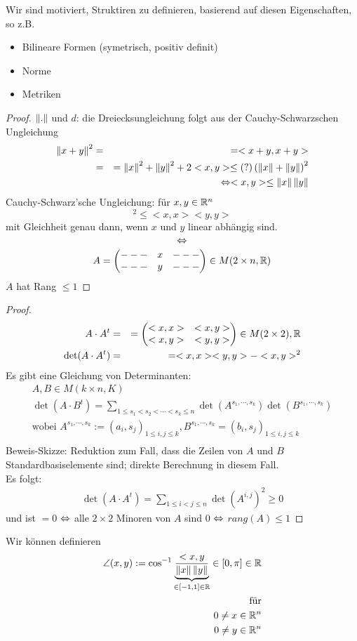 Wir sind motiviert, Struktiren zu definieren, basierend auf diesen Eigenschaften, so z.B.
\begin{itemize}
  \item Bilineare Formen (symetrisch, positiv definit)
  \item Norme
  \item Metriken
\end{itemize}
\begin{proof} $\left\| . \right\|$ und $d$: die Dreiecksungleichung folgt aus der Cauchy-Schwarzschen Ungleichung
\begin{align*}
  \left\| x+y \right\|^2&=&=<x+y,x+y>\\
  &=&=\left\| x \right\|^2+\left\| y \right\|^2+2<x,y> \leq (?) \left(\left\| x \right\|+\left\| y \right\|\right)^2\\
  &&\Leftrightarrow <x,y> \leq \left\| x \right\|\left\| y \right\|
\end{align*}
Cauchy-Schwarz'sche Ungleichung: für $x,y\in\mathbb{R}^n$
\[<x,y>^2\leq<x,x><y,y>\]
mit Gleichheit genau dann, wenn $x$ und $y$ linear abhängig sind.
\[\Leftrightarrow\]
\[A=\begin{pmatrix}---&x&---\\---&y&---\end{pmatrix}\in M(2\times n,\mathbb{R})\]
$A$ hat Rang $\leq 1$
\end{proof}
\begin{proof}
\begin{align*}
  A\cdot{}A^t&=&=\begin{pmatrix}<x,x>&<x,y>\\<x,y>&<y,y>\end{pmatrix}\in M(2\times 2),\mathbb{R}\\
  \det(A\cdot{}A^t)&=&=<x,x><y,y>-<x,y>^2
\end{align*}
Es gibt eine Gleichung von Determinanten:
\begin{align*}
  A,B\in M(k\times n,K)\\
  \det(A\cdot B^t)=\sum_{1\leq s_1 <s_2<\cdots<s_k\leq n} \det(A^{s_1,\cdots,s_k})\det(B^{s_1,\cdots,s_k})\\
  \text{wobei } A^{s_1,\cdots,s_k}:=(a_i,s_j)_{1\leq i,j\leq k}, B^{s_1,\cdots,s_k}=(b_i,s_j)_{1\leq i,j\leq k}\\
\end{align*}
Beweis-Skizze: Reduktion zum Fall, dass die Zeilen von $A$ und $B$ Standardbasiselemente sind; direkte Berechnung in diesem Fall.\\
Es folgt:
\begin{align*}
  \det(A\cdot A^t)=\sum_{1\leq i < j \leq n} \det(A^{i,j})^2 \geq 0
\end{align*}
und ist $=0$ $\Leftrightarrow$ alle $2\times 2$ Minoren von $A$ sind 0 $\Leftrightarrow$ $rang(A)\leq 1$
\end{proof}
\begin{Kor} Wir können definieren
\begin{align*}
  \angle(x,y):=\cos^{-1}\underbrace{\frac{<x,y}{\left\| x \right\|\left\| y \right\|}}_{\in [-1,1]\in\mathbb{R}} \in [0,\pi]\in\mathbb{R}\\
  \text{für}\\
  0\neq x\in\mathbb{R}^n\\
  0\neq y\in\mathbb{R}^n
\end{align*}
\end{Kor}
